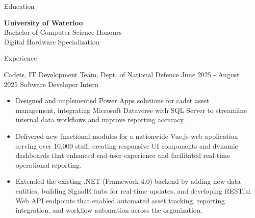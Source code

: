\documentclass{resume}
\newcommand{\tagged}[2]{\hypertarget{#1}{#2}}
\begin{document}
\begin{rSection}{Education}

{\fontsize{11}{15}\bf \tagged{5c6339ca_school}{University of Waterloo}} \hfill {\tagged{5c6339ca_location}{}} \\
{\fontsize{10}{12} \tagged{5c6339ca_degree}{Bachelor of Computer Science Honours}} \hfill {\small \tagged{5c6339ca_date}{}} \\
{\fontsize{9}{12}\selectfont \tagged{5c6339ca_field}{Digital Hardware Specialization}}

\end{rSection}

\begin{rSection}{Experience}

\begin{rSubsection}
  {\tagged{427cf710_company}{Cadets, IT Development Team, Dept. of National Defence}}
  {\small \tagged{427cf710_date}{June 2025 - August 2025}}
  {\tagged{427cf710_title}{Software Developer Intern}}
  {\textit{\tagged{427cf710_location}{}}}
{\fontsize{10}{12}\selectfont
\begin{itemize}
  \itemsep -0.5em

  \item \tagged{experience_427cf710_b1}{Designed and implemented Power Apps solutions for cadet asset management, integrating Microsoft Dataverse with SQL Server to streamline internal data workflows and improve reporting accuracy.}

  \item \tagged{experience_427cf710_b2}{Delivered new functional modules for a nationwide Vue.js web application serving over 10,000 staff, creating responsive UI components and dynamic dashboards that enhanced end‑user experience and facilitated real‑time operational reporting.}

  \item \tagged{experience_427cf710_b3}{Extended the existing .NET (Framework 4.0) backend by adding new data entities, building SignalR hubs for real‑time updates, and developing RESTful Web API endpoints that enabled automated asset tracking, reporting integration, and workflow automation across the organization.}

\end{itemize}
}
\end{rSubsection}
\vspace{-3mm}


\end{rSection}
\end{document}
